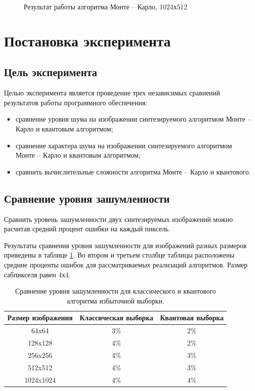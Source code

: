 \begin{figure}[H]
	\begin{center}
	\end{center}
	\captionsetup{justification=centering}
	\caption{Результат работы алгоритма Монте -- Карло, 1024х512}
	\label{img:example_03-mc}
\end{figure}

\section{Постановка эксперимента} 

\subsection{Цель эксперимента}

Целью эксперимента является проведение трех независимых сравнений результатов работы программного обеспечения:

\begin{itemize}
	\item сравнение уровня шума на изображении синтезируемого алгоритмом Монте -- Карло и квантовым алгоритмом;
	\item сравнение характера шума на изображении синтезируемого алгоритмом Монте -- Карло и квантовым алгоритмом;
	\item сравнить вычислительные сложности алгоритма Монте -- Карло и квантового.
\end{itemize}

\subsection{Сравнение уровня зашумленности}

Сравнить уровень зашумленности двух синтезируемых изображений можно расчитав средний процент ошибки на каждый пиксель.

Результаты сравнения уровня зашумленности для изображений разных размеров приведены в таблице \ref{tab:noise}. Во втором и третьем столбце таблицы расположены средние проценты ошибок для рассматриваемых реализаций алгоритмов. Размер сабпикселя равен 4х4.

\begin{table}[h!]
	\caption{Сравнение уровня зашумленности для классического и квантового алгоритма избыточной выборки.}
	\label{tab:noise}
	\begin{center}
		\begin{tabular}{|c | c | c|} 
			\hline
			Размер изображения & Классическая выборка & Квантовая выборка \\  
			\hline
			64x64 & 3\% & 2\%  \\
			\hline
			128x128 & 4\% & 2\% \\
			\hline
			256x256 & 4\% & 3\% \\
			\hline
			512x512 & 4\% & 3\% \\
			\hline
			1024x1024 & 4\%  & 4\% \\
			\hline
		\end{tabular}
	\end{center}
\end{table}

